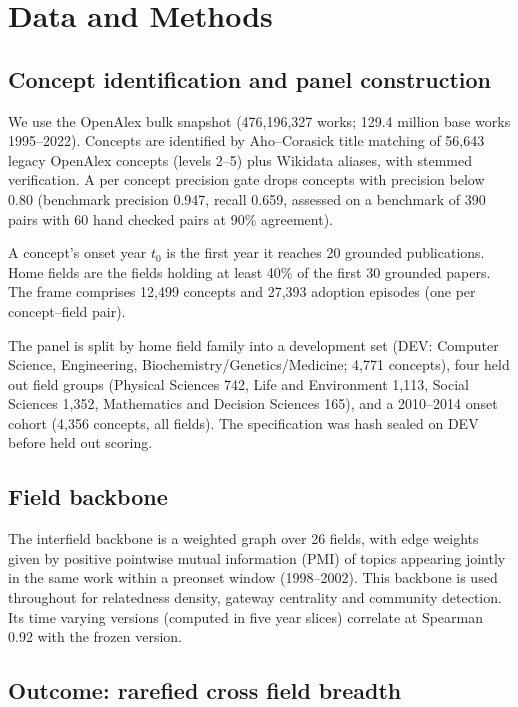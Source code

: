 \documentclass[11pt,letterpaper]{article}
\begin{document}
\section{Data and Methods}
\label{sec:methods}

\subsection{Concept identification and panel construction}

We use the OpenAlex bulk snapshot (476,196,327 works; 129.4 million base works
1995--2022). Concepts are identified by Aho--Corasick title matching of 56,643
legacy OpenAlex concepts (levels 2--5) plus Wikidata aliases, with stemmed
verification. A per concept precision gate drops concepts with precision below
0.80 (benchmark precision 0.947, recall 0.659, assessed on a benchmark of 390 pairs
with 60 hand checked pairs at 90\% agreement).

A concept's onset year $t_0$ is the first year it reaches 20 grounded
publications. Home fields are the fields holding at least 40\% of the first 30
grounded papers. The frame comprises 12,499 concepts and 27,393 adoption episodes (one per
concept--field pair).

The panel is split by home field family into a development set (DEV: Computer
Science, Engineering, Biochemistry/Genetics/Medicine; 4,771 concepts), four
held out field groups (Physical Sciences 742, Life and Environment 1,113, Social
Sciences 1,352, Mathematics and Decision Sciences 165), and a 2010--2014 onset
cohort (4,356 concepts, all fields). The specification was hash sealed on DEV
before held out scoring.

\subsection{Field backbone}

The interfield backbone is a weighted graph over 26 fields, with edge weights
given by positive pointwise mutual information (PMI) of topics appearing jointly
in the same work within a preonset window (1998--2002). This backbone is used throughout for relatedness
density, gateway centrality and community detection. Its time varying versions
(computed in five year slices) correlate at Spearman 0.92 with the frozen version.

\subsection{Outcome: rarefied cross field breadth}
\end{document}
